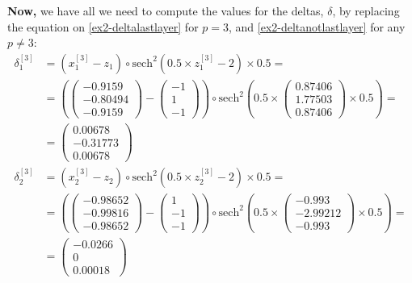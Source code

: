 \documentclass[12pt]{article}
\begin{document}
\begin{enumerate}[leftmargin=\labelsep]
        \textbf{Now,} we have all we need to compute the values for the deltas, $\delta$, by replacing the equation on \eqref{ex2-deltalastlayer} for $p=3$,
        and \eqref{ex2-deltanotlastlayer} for any $p \neq 3$:
        \begingroup
        \allowdisplaybreaks
          \begin{align*}
            \delta^{[3]}_1 &= \left(x^{[3]}_1 - z_1\right) \circ  \text{sech}^{2}\left(0.5\times z^{[3]}_1 - 2\right) \times 0.5 =  \\
            &=  \left(\begin{pmatrix} -0.9159 \\ -0.80494 \\ -0.9159\end{pmatrix} - \begin{pmatrix} -1 \\ 1 \\ -1 \end{pmatrix}\right) \circ \text{sech}^{2}\left(0.5\times \begin{pmatrix} 0.87406 \\ 1.77503 \\ 0.87406\end{pmatrix} \times 0.5\right) = \\
            &= \begin{pmatrix} 0.00678 \\ -0.31773 \\ 0.00678 \end{pmatrix} \\
            \delta^{[3]}_2 &= \left(x^{[3]}_2 - z_2\right) \circ  \text{sech}^{2}\left(0.5\times z^{[3]}_2 - 2\right) \times 0.5 =  \\
            &=  \left(\begin{pmatrix} -0.98652 \\ -0.99816 \\ -0.98652\end{pmatrix} - \begin{pmatrix} 1 \\ -1 \\ -1\end{pmatrix}\right) \circ \text{sech}^{2}\left(0.5\times \begin{pmatrix} -0.993 \\ -2.99212 \\ -0.993\end{pmatrix} \times 0.5\right) = \\
            &= \begin{pmatrix} -0.0266 \\ 0 \\ 0.00018 \end{pmatrix}
          \end{align*}
        \endgroup


\end{enumerate}
\end{document}
